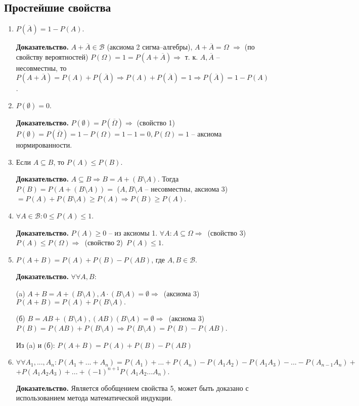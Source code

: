 \subsection*{Простейшие свойства}

\begin{enumerate}
	\item $P(\overline{A}) = 1 - P(A)$.
	
	\textbf{Доказательство.} $A + \overline{A} \in \mathcal{B}$ (аксиома 2 сигма--алгебры), $A + \overline{A} = \Omega$ $\Rightarrow$ (по свойству вероятностей) $P(\Omega) = 1 = P(A + \overline{A}) \Rightarrow$ т. к. $A, \overline{A}$ -- несовместны, то $P(A + \overline{A}) = P(A) + P(\overline{A}) \Rightarrow P(A) + P(\overline{A}) = 1 \Rightarrow P(\overline{A}) = 1 - P(A)$.
	
	\item $P(\emptyset) = 0$.
	
	\textbf{Доказательство.} $P(\emptyset) = P(\overline{\Omega}) \Rightarrow$ (свойство 1)  $P(\emptyset) = P(\overline{\Omega}) = 1 - P(\Omega) = 1 - 1 = 0, P(\Omega) = 1$ -- аксиома нормированности.
	
	\item Если $A \subseteq B$, то $P(A) \leq P(B)$.
	
	\textbf{Доказательство.} $A \subseteq B \Rightarrow B = A + (B \setminus A)$. Тогда $P(B) = P(A + (B \setminus A)) =$ ($A, B \setminus A$ -- несовместны, аксиома 3) $=P(A) + P(B \setminus A) \geq P(A) \Rightarrow P(B) \geq P(A)$.
	
	\item $\forall A \in \mathcal{B}: 0 \leq P(A) \leq 1$.
	
	\textbf{Доказательство.} $P(A) \geq 0$ -- из аксиомы 1. $\forall A: A \subseteq \Omega \Rightarrow$~(свойство 3)~$P(A) \leq P(\Omega) \Rightarrow$~(свойство 2)~$P(A) \leq 1$.
	
	\item $P(A + B) = P(A) + P(B) - P(AB)$, где $A, B \in \mathcal{B}$.
	
	\textbf{Доказательство.} $\forall\forall A, B:$ 
	
	(a) $A + B = A + (B \setminus A), A \cdot (B \setminus A) = \emptyset \Rightarrow$~(аксиома 3)~$P(A+B) = P(A) + P(B \setminus A).$  
	
	(б) $B = AB + (B \setminus A), (AB)(B \setminus A) = \emptyset \Rightarrow$~(аксиома 3)~$P(B) = P(AB) + P(B \setminus A) \Rightarrow P(B \setminus A) = P(B) - P(AB)$.
	
	Из (a) и (б): $P(A + B) = P(A) + P(B) - P(AB)$
	
	\item $\forall \forall A_1, ..., A_n: P(A_1 + ... + A_n) = P(A_1) + ... + P(A_n) - P(A_1A_2) - P(A_1A_3) - ... - P(A_{n-1}A_n) +$ $+ P(A_1A_2A_3) + ... + (-1)^{n+1}P(A_1A_2...A_n).$
	
	\textbf{Доказательство.} Является обобщением свойства 5, может быть доказано с использованием метода математической индукции.
\end{enumerate}

